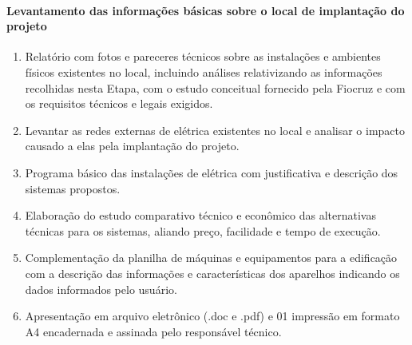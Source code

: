 \paragraph{Levantamento das informações básicas sobre o local de implantação do projeto}
	\begin{enumerate}
		\item Relatório com fotos e pareceres técnicos sobre as instalações e ambientes físicos existentes no local, incluindo análises relativizando as informações recolhidas nesta Etapa, com o estudo conceitual fornecido pela Fiocruz e com os requisitos técnicos e legais exigidos.
		
		\item Levantar as redes externas de elétrica existentes no local e analisar o impacto causado a elas pela implantação do projeto. 
		
		\item Programa básico das instalações de elétrica com justificativa e descrição dos sistemas propostos.
		
		\item Elaboração do estudo comparativo técnico e econômico das alternativas técnicas para os sistemas, aliando preço, facilidade e tempo de execução.
		
		\item Complementação da planilha de máquinas e equipamentos para a edificação com a descrição das informações e características dos aparelhos indicando os dados informados pelo usuário. 
		
		\item Apresentação em arquivo eletrônico (.doc e .pdf) e 01 impressão em formato A4 encadernada e assinada pelo responsável técnico.
	\end{enumerate}

